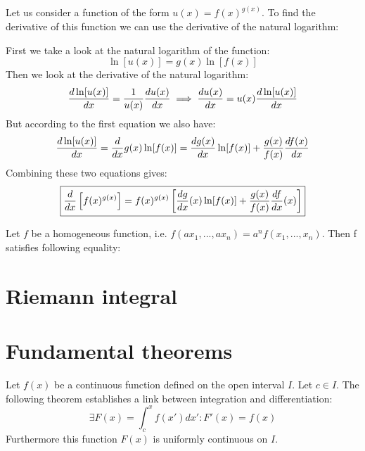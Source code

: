 	\begin{method}[Derivative of $f(x)^{g(x)}$]
		Let us consider a function of the form $u(x)=f(x)^{g(x)}$. To find the derivative of this function we can use the derivative of the natural logarithm:\par
				
		\noindent First we take a look at the natural logarithm of the function: \[\ln[u(x)] = g(x)\ln[f(x)]\] Then we look at the derivative of the natural logarithm:\[\deriv{\ln[u(x)]}{x} = \stylefrac{1}{u(x)}\deriv{u(x)}{x} \implies \deriv{u(x)}{x} = u(x)\deriv{\ln[u(x)]}{x}\] But according to the first equation we also have:\[\deriv{\ln[u(x)]}{x} = \deriv{}{x}g(x)\ln[f(x)] = \deriv{g(x)}{x}\ln[f(x)] + \stylefrac{g(x)}{f(x)}\deriv{f(x)}{x}\] Combining these two equations gives:
		\begin{equation}
			\label{calculus:derivative_f^g}
			\boxed{\deriv{}{x}\left[f(x)^{g(x)}\right] = f(x)^{g(x)}\left[\deriv{g}{x}(x)\ln[f(x)] + \stylefrac{g(x)}{f(x)}\deriv{f}{x}(x)\right]}
		\end{equation}
	\end{method}
	
	\begin{theorem}
		Let $f$ be a homogeneous function, i.e. $f(ax_1, ..., ax_n) = a^nf(x_1, ..., x_n)$. Then f satisfies following equality:
	\end{theorem}

	\section{Riemann integral}

	\section{Fundamental theorems}
    
	    \begin{theorem}
			Let $f(x)$ be a continuous  function defined on the open interval $I$. Let $c \in I$. The following theorem establishes a link between integration and differentiation:
            \begin{equation}
				\label{calculus:first_fundamental_theorem}
                \boxed{\exists F(x) = \int_c^xf(x')dx':F'(x) = f(x)}
			\end{equation}
            Furthermore this function $F(x)$ is uniformly continuous on $I$.
		\end{theorem}
        
